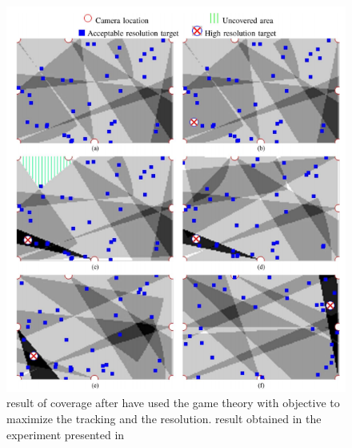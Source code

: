 \begin{figure}[t!]
   \includegraphics[width=\linewidth]{img/CoverageFrom18.png}
  \caption{ result of coverage after have used the game theory with objective to maximize the tracking and the resolution. result obtained in the experiment presented in \cite{18*ding2012}}\label{fig:CoverageFrom18}
  \endminipage\hfill
\end{figure}
	
